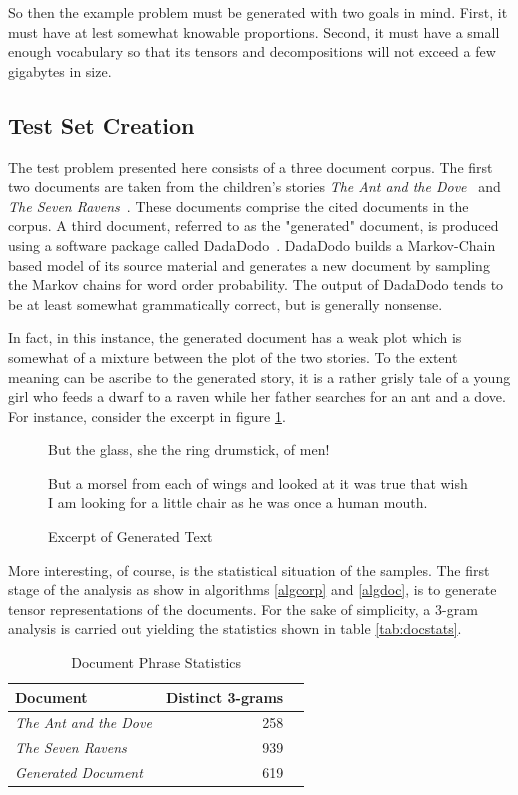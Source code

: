 \documentclass{article}
\begin{document}
So then the example problem must be generated with two goals in mind.
First, it must have at lest somewhat knowable proportions.  Second, it
must have a small enough vocabulary so that its tensors and
decompositions will not exceed a few gigabytes in size.

\subsection{Test Set Creation}
The test problem presented here consists of a three document corpus.
The first two documents are taken from the children's stories {\em The
Ant and the Dove}~\cite{aesop} and {\em The Seven
Ravens}~\cite{aesop}.  These documents comprise the cited documents in
the corpus.  A third document, referred to as the "generated"
document, is produced using a software package called
DadaDodo~\cite{dada}.  DadaDodo builds a Markov-Chain based model of
its source material and generates a new document by sampling the
Markov chains for word order probability.  The output of DadaDodo
tends to be at least somewhat grammatically correct, but is generally
nonsense. 

In fact, in this instance, the generated document has a weak plot
which is somewhat of a mixture between the plot of the two stories.
To the extent meaning can be ascribe to the generated story, it is
a rather grisly tale of a young girl who feeds a dwarf to a raven
while her father searches for an ant and a dove.  For instance,
consider the excerpt in figure \ref{fig:gentext}.

\begin{figure}
  \label{fig:gentext}
  \begin{displayquote}
But the glass, she the ring drumstick, of men! 

But a morsel from each of wings and looked at it was true that wish I am
looking for a little chair as he was once a human mouth. 
  \end{displayquote}
  \caption{Excerpt of Generated Text}
\end{figure}

More interesting, of course, is the statistical situation of the
samples.  The first stage of the analysis as show in 
algorithms \ref{algcorp} and \ref{algdoc}, is to generate tensor
representations of the documents.  For the sake of simplicity,
a 3-gram analysis is carried out yielding the statistics shown in
table \ref{tab:docstats}.

\begin{table}
    \label{docstats}
    \begin{tabular}{l|r|r}
    {\bf Document} & {\bf Distinct 3-grams} \\
    \hline
    {\em The Ant and the Dove} & 258 \\
    {\em The Seven Ravens} & 939 \\
    \hline
    {\em Generated Document} & 619\\
    \end{tabular}
    \caption{Document Phrase Statistics}
\end{table}
\end{document}
